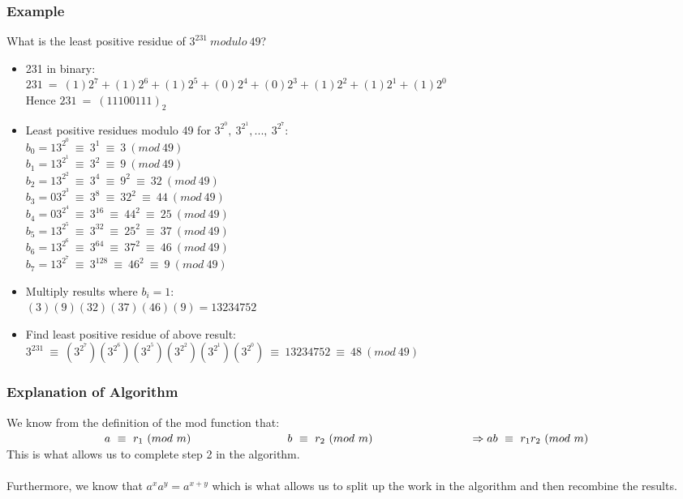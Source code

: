\documentclass{article}
\newcommand\tab[1][3cm]{\hspace*{#1}}
\newcommand\tabOne[1][1cm]{\hspace*{#1}}
\begin{document}
	\subsubsection{Example}
	What is the least positive residue of $3^231~modulo~49$?\\
		\begin{itemize}
			\item 231 in binary:\\
				\tabOne $231~=~(1)2^7+(1)2^6+(1)2^5+(0)2^4+(0)2^3+(1)2^2+(1)2^1+(1)2^0$\\
				\tabOne Hence $231~=~(1110 0111)_2$
			\item Least positive residues modulo 49 for $3^{2^0},~3^{2^1},...,~3^{2^7}$:\\
				$b_0=1$\tabOne $3^{2^0}~\equiv~3^{1}~\equiv~3~(mod~49)$\\
				$b_1=1$\tabOne $3^{2^1}~\equiv~3^{2}~\equiv~9~(mod~49)$\\
				$b_2=1$\tabOne $3^{2^2}~\equiv~3^{4}~\equiv~9^2~\equiv~32~(mod~49)$\\
				$b_3=0$\tabOne $3^{2^3}~\equiv~3^{8}~\equiv~32^2~\equiv~44~(mod~49)$\\
				$b_4=0$\tabOne $3^{2^4}~\equiv~3^{16}~\equiv~44^2~\equiv~25~(mod~49)$\\
				$b_5=1$\tabOne $3^{2^5}~\equiv~3^{32}~\equiv~25^2~\equiv~37~(mod~49)$\\
				$b_6=1$\tabOne $3^{2^6}~\equiv~3^{64}~\equiv~37^2~\equiv~46~(mod~49)$\\
				$b_7=1$\tabOne $3^{2^7}~\equiv~3^{128}~\equiv~46^2~\equiv~9~(mod~49)$\\
			\item Multiply results where $b_i=1$:\\
				\tabOne $(3)(9)(32)(37)(46)(9) = 13234752$
			\item Find least positive residue of above result:\\
				\tabOne $3^{231}~\equiv~(3^{2^7})(3^{2^6})(3^{2^5})(3^{2^2})(3^{2^1})(3^{2^0})~\equiv~13234752~\equiv~48~(mod~49)$
		\end{itemize}
	
	\subsubsection{Explanation of Algorithm}
	We know from the definition of the mod function that:\\
		$
			\tab	a~\equiv~r_1~(mod~m)\\
			\tab	b~\equiv~r_2~(mod~m)\\
			\tab \Rightarrow ab~\equiv~r_1r_2~(mod~m) \\
		$\\
	This is what allows us to complete step 2 in the algorithm.\\
	\\
	Furthermore, we know that $a^xa^y=a^{x+y}$ which is what allows us to split up the work in the algorithm and then recombine the results.
	
\end{document}

